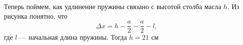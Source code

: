 Теперь поймем, как удлинение пружины связано с высотой столба масла $h$. Из рисунка понятно, что
\begin{equation}
	\Delta x = h -\frac{a}{2} -\frac{a}{2} - l, 
\end{equation}
где $l$ --- начальная длина пружины. Тогда $h = 21\text{ см}$


\ifgrade
\begin{grade-env}
\end{grade-env}
\fi